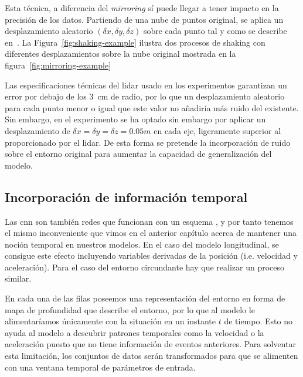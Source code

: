 Esta técnica, a diferencia del \textit{mirroring} sí puede llegar a tener impacto en la precisión de los datos. Partiendo de una nube de puntos original, se aplica un desplazamiento aleatorio $(\delta x, \delta y, \delta z)$ sobre cada punto tal y como se describe en~\cite{diaz2018modelling}. La Figura~\ref{fig:shaking-example} ilustra dos procesos de shaking con diferentes desplazamientos sobre la nube original mostrada en la figura~\ref{fig:mirroring-example}

Las especificaciones técnicas del \acrshort{lidar} usado en los experimentos garantizan un error por debajo de los \SI{3}{\cm} de radio, por lo que un desplazamiento aleatorio para cada punto menor o igual que este valor no añadiría más ruido del existente. Sin embargo, en el experimento se ha optado sin embargo por aplicar un desplazamiento de $\delta x = \delta y = \delta z = 0.05m$ en cada eje, ligeramente superior al proporcionado por el \acrshort{lidar}. De esta forma se pretende la incorporación de ruido sobre el entorno original para aumentar la capacidad de generalización del modelo.

\subsection{Incorporación de información temporal}

Las \ac{cnn} son también redes que funcionan con un esquema \textit{}, y por tanto tenemos el mismo inconveniente que vimos en el anterior capítulo acerca de mantener una noción temporal en nuestros modelos. En el caso del modelo longitudinal, se consigue este efecto incluyendo variables derivadas de la posición (i.e. velocidad y aceleración). Para el caso del entorno circundante hay que realizar un proceso similar.

En cada una de las filas poseemos una representación del entorno en forma de mapa de profundidad que describe el entorno, por lo que al modelo le alimentaríamos únicamente con la situación en un instante $t$ de tiempo. Esto no ayuda al modelo a descubrir patrones temporales como la velocidad o la aceleración puesto que no tiene información de eventos anteriores. Para solventar esta limitación, los conjuntos de datos serán transformados para que se alimenten con una ventana temporal de parámetros de entrada.

